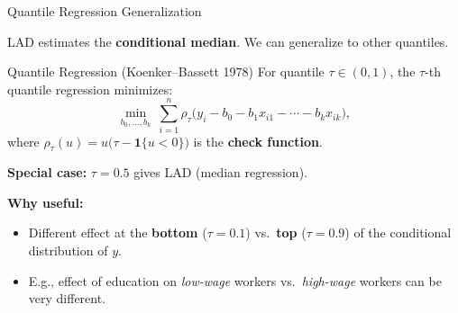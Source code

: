 \documentclass[aspectratio=169, 12pt]{beamer}
\begin{document}
\begin{frame}[shrink=25]{Quantile Regression Generalization}

  LAD estimates the \textbf{conditional median}. We can generalize to other quantiles.

  \begin{definitionbox}{Quantile Regression (Koenker--Bassett 1978)}
    For quantile $\tau \in (0, 1)$, the $\tau$-th quantile regression minimizes:
    \[
      \min_{b_0, \ldots, b_k}\ \sum_{i=1}^n \rho_\tau\bigl(y_i - b_0 - b_1 x_{i1} - \cdots - b_k x_{ik}\bigr),
    \]
    where $\rho_\tau(u) = u\bigl(\tau - \mathbf{1}\{u < 0\}\bigr)$ is the
    \textbf{check function}.

    \medskip
    \textbf{Special case:} $\tau = 0.5$ gives LAD (median regression).
  \end{definitionbox}

  \begin{highlightbox}
    \textbf{Why useful:}
    \begin{itemize}\setlength{\itemsep}{1pt}
      \item Different effect at the \textbf{bottom} ($\tau = 0.1$) vs.\ \textbf{top}
      ($\tau = 0.9$) of the conditional distribution of $y$.
      \item E.g., effect of education on \emph{low-wage} workers vs.\ \emph{high-wage} workers
      can be very different.
    \end{itemize}
  \end{highlightbox}

\end{frame}
\end{document}
